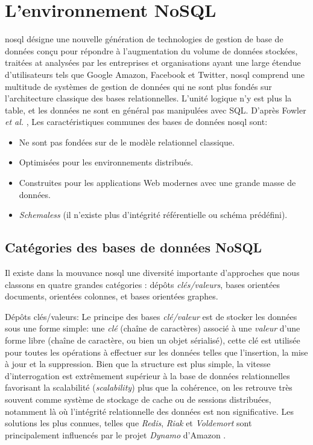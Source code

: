 \section{L'environnement NoSQL}
\label{sec:nosql}
\acrshort{nosql} désigne une nouvelle génération de technologies de
gestion de base de données conçu pour répondre à l'augmentation du
volume de données stockées, traitées at analysées par les entreprises
et organisations ayant une large étendue d'utilisateurs tels que
Google Amazon, Facebook et Twitter, \acrshort{nosql} comprend une
multitude de systèmes de gestion de données qui ne sont plus fondés
sur l'architecture classique des bases relationnelles. L'unité logique
n'y est plus la table, et les données ne sont en général pas
manipulées avec \textsc{SQL}.  D'après Fowler \textit{et al.}
\cite{sadalage2012nosql}, Les caractéristiques communes des bases de
données \acrshort{nosql} sont:

\begin{itemize}\renewcommand\labelitemi{--}
\item Ne sont pas fondées sur de le modèle relationnel classique.
\item Optimisées pour les environnements distribués.
\item Construites pour les applications Web modernes avec une grande
  masse de données.
\item \emph{Schemaless} (il n'existe plus d'intégrité référentielle ou
  schéma prédéfini).
\end{itemize}
  \subsection{Catégories des bases de données NoSQL}
  \label{sec:cat-nosql}
  Il existe dans la mouvance \acrshort{nosql} une diversité importante
  d'approches que nous classons en quatre grandes catégories
  \cite{sadalage2012nosql}: dépôts \textit {clés/valeurs}, bases
  orientées documents, orientées colonnes, et bases orientées
  graphes.\bigskip

  \textsf{Dépôts clés/valeurs}: Le principe des bases
  \textit{clé/valeur} est de stocker les données sous une forme
  simple: une \emph{clé } (chaîne de caractères) associé à une
  \emph{valeur} d'une forme libre (chaîne de caractère, ou bien un
  objet sérialisé), cette clé est utilisée pour toutes les opérations
  à effectuer sur les données telles que l'insertion, la mise à jour
  et la suppression. Bien que la structure est plus simple, la vitesse
  d'interrogation est extrêmement supérieur à la base de données
  relationnelles favorisant la scalabilité (\emph{scalability}) plus
  que la cohérence, on les retrouve très souvent comme système de
  stockage de cache ou de sessions distribuées, notamment là où
  l'intégrité relationnelle des données est non significative. Les
  solutions les plus connues, telles que \emph{Redis}, \emph{Riak} et
  \emph{Voldemort} sont principalement influencés par le projet
  \emph{Dynamo} d'Amazon \cite{decandia2007dynamo}.\bigskip

